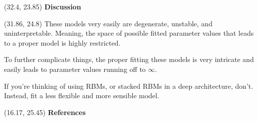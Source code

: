 \documentclass[extrafontsizes, 30pt]{memoir}
\begin{document}
\begin{textblock}{14}(32.4, 23.85)
{\large \bfseries Discussion} \\[.25cm]
\end{textblock}

\begin{textblock}{14.54}(31.86, 24.8)
These models very easily are degenerate, unstable, and uninterpretable. Meaning, the space of possible fitted parameter values that leads to a proper model is highly restricted.

To further complicate things, the proper fitting these models is very intricate and easily leads to parameter values running off to $\infty$.

If you're thinking of using RBMs, or stacked RBMs in a deep architecture, don't. Instead, fit a less flexible and more sensible model.
\end{textblock}

\begin{textblock}{14.5}(16.17, 25.45)
{\large \bfseries References}
\printbibliography[heading=none]

\end{textblock}
\end{document}
